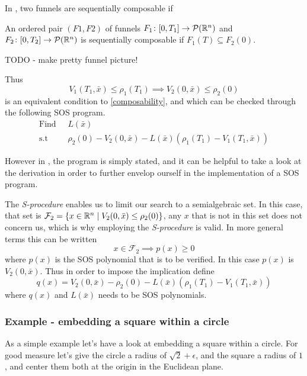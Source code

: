In \cite[Majumdar and Tedrake, p.~47]{majumdarFunnelLibrariesRealtime2017}, two
funnels are sequentially composable if
\begin{definition}
  \label{def:funnel-composition}
  An ordered pair \((F1, F2)\) of funnels \(F_1 \colon [0,T_1] \rightarrow
  \mathcal{P}(\mathbb{R}^n)\) and \(F_2 \colon [0,T_2] \rightarrow \mathcal{P}(\mathbb{R}^n)\)
  is sequentially composable if \(F_1(T) \subseteq F_2(0)\).
\end{definition}

TODO - make pretty funnel picture!

Thus
\[
  V_1(T_1,\bar{x}) \leq \rho_1(T_1) \implies V_2(0,\bar{x}) \leq \rho_2(0)
\]
is an equivalent condition to \ref{composability}, and which can be checked
through the following \ac{SOS} program.
\begin{align*}
  \text{Find } \; &L(\bar{x}) \\
  \text{s.t} \; &\rho_2(0) - V_2(0,\bar{x}) - L(\bar{x})
                  \left( \rho_1(T_1) - V_1(T_1,\bar{x}) \right)
\end{align*}
\cite[Majumdar and Tedrake, p.~54]{majumdarFunnelLibrariesRealtime2017}

However in \cite[Majumdar and Tedrake]{majumdarFunnelLibrariesRealtime2017}, the
program is simply stated, and it can be helpful to take a look at the derivation
in order to further envelop ourself in the implementation of a \ac{SOS} program.

The \textit{S-procedure} enables us to limit our search to a semialgebraic set.
In this case, that set is \(\mathcal{F}_2 = \lbrace x \in \mathbb{R}^n \mid V_2(0,\bar{x})
  \leq \rho_2(0)\rbrace\), any \(x\) that is not in this set does not concern us,
which is why employing the \textit{S-procedure} is valid. In more general terms
this can be written
\[
  x \in \mathcal{F}_2 \implies p(x) \geq 0
\]
where \(p(x)\) is the \ac{SOS} polynomial that is to be verified. In this case
\(p(x)\) is \(V_2(0,\bar{x})\). Thus in order to impose the implication define
\[
  q(x) = V_2(0,\bar{x}) - \rho_2(0) - L(\bar{x}) \left( \rho_1(T_1) -
    V_1(T_1,\bar{x}) \right)
\]
where \(q(x)\) and \(L(\bar{x})\) needs to be SOS polynomials.

\subsubsection{Example - embedding a square within a circle}

As a simple example let's have a look at embedding a square within a circle. For
good measure let's give the circle a radius of \(\sqrt{2}+\epsilon\), and the
square a radius of \(1\), and center them both at the origin in the Euclidean
plane.

